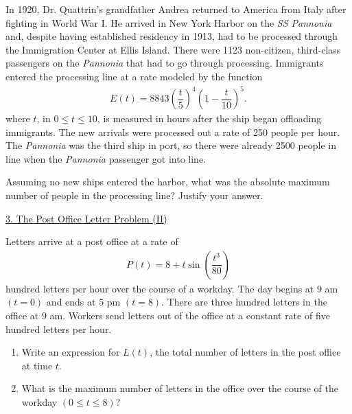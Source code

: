 In 1920, Dr. Quattrin's grandfather Andrea returned to America from Italy after fighting in World War I. He arrived in New York Harbor on the \textit{SS Pannonia} and, despite having established residency in 1913, had to be processed through the Immigration Center at Ellis Island. There were 1123 non-citizen, third-class passengers on the \textit{Pannonia} that had to go through processing. Immigrants entered the processing line at a rate modeled by the function \begin{align*}
    E(t) = 8843\left(\dfrac{t}{5}\right)^4\left(1 - \dfrac{t}{10}\right)^5.
\end{align*}
where $t$, in $0 \leq t \leq 10$, is measured in hours after the ship began offloading immigrants. The new arrivals were processed out a rate of 250 people per hour. The \textit{Pannonia} was the third ship in port, so there were already 2500 people in line when the \textit{Pannonia} passenger got into line. \par
\vspace{11pt}
Assuming no new ships entered the harbor, what was the absolute maximum number of people in the processing line? Justify your answer. \\

\begin{center}
    \underline{3. The Post Office Letter Problem (II)}
\end{center}

Letters arrive at a post office at a rate of \begin{align*}
    P(t) = 8 + t\sin \left(\dfrac{t^3}{80}\right)
\end{align*}
hundred letters per hour over the course of a workday. The day begins at $9$ am $(t = 0)$ and ends at $5$ pm $(t = 8)$. There are three hundred letters in the office at $9$ am. Workers send letters out of the office at a constant rate of five hundred letters per hour. \\
\begin{enumerate}[label=\hspace{11pt}(\alph*), align=left, leftmargin=*, labelsep=0.25em]
    \item Write an expression for $L(t)$, the total number of letters in the post office at time $t$.
    \item What is the maximum number of letters in the office over the course of the workday $(0 \leq t \leq 8)$?
\end{enumerate} \vspace{11pt}

